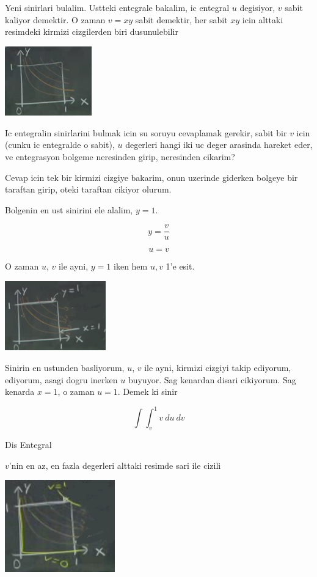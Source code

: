 \documentclass[12pt,fleqn]{article}\usepackage{../common}
\begin{document}
Yeni sinirlari bulalim. Ustteki entegrale bakalim, ic entegral $u$
degisiyor, $v$ sabit kaliyor demektir. O zaman $v=xy$ sabit demektir, her
sabit $xy$ icin alttaki resimdeki kirmizi cizgilerden biri dusunulebilir

\includegraphics[height=3cm]{18_6.png}

Ic entegralin sinirlarini bulmak icin su soruyu cevaplamak gerekir, sabit
bir $v$ icin (cunku ic entegralde o sabit), $u$ degerleri hangi iki uc
deger arasinda hareket eder, ve entegrasyon bolgeme neresinden girip,
neresinden cikarim? 

Cevap icin tek bir kirmizi cizgiye bakarim, onun uzerinde giderken bolgeye
bir taraftan girip, oteki taraftan cikiyor olurum. 

Bolgenin en ust sinirini ele alalim, $y=1$. 

\[ y = \frac{v}{u}  \]

\[ u = v \]

O zaman $u$, $v$ ile ayni, $y=1$ iken hem $u,v$ 1'e esit.

\includegraphics[height=3cm]{18_7.png}

Sinirin en ustunden basliyorum, $u$, $v$ ile ayni, kirmizi cizgiyi takip
ediyorum, ediyorum, asagi dogru inerken $u$ buyuyor. Sag kenardan disari
cikiyorum. Sag kenarda $x=1$, o zaman $u = 1$. Demek ki sinir

\[ \int \int _v^1 v \ du \ dv \]

Dis Entegral 

$v$'nin en az, en fazla degerleri alttaki resimde sari ile cizili

\includegraphics[height=4cm]{18_8.png}
\end{document}
